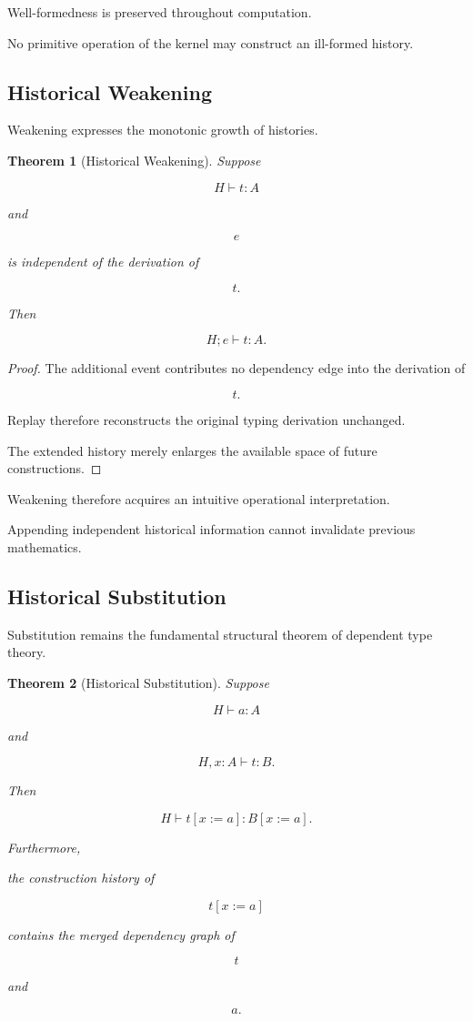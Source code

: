 \documentclass[12pt,oneside]{article}
\newtheorem{theorem}{Theorem}[section]
\theoremstyle{definition}
\theoremstyle{remark}
\begin{document}
Well-formedness is preserved throughout computation.

No primitive operation of the kernel may construct an ill-formed history.

\subsection{Historical Weakening}

Weakening expresses the monotonic growth of histories.

\begin{theorem}[Historical Weakening]

Suppose

\[
H
\vdash
t:A
\]

and

\[
e
\]

is independent of the derivation of

\[
t.
\]

Then

\[
H;e
\vdash
t:A.
\]

\end{theorem}

\begin{proof}

The additional event contributes no dependency edge into the derivation of

\[
t.
\]

Replay therefore reconstructs the original typing derivation unchanged.

The extended history merely enlarges the available space of future
constructions.

\end{proof}

Weakening therefore acquires an intuitive operational interpretation.

Appending independent historical information cannot invalidate previous
mathematics.

\subsection{Historical Substitution}

Substitution remains the fundamental structural theorem of dependent type
theory.

\begin{theorem}[Historical Substitution]

Suppose

\[
H
\vdash
a:A
\]

and

\[
H,x:A
\vdash
t:B.
\]

Then

\[
H
\vdash
t[x:=a]
:
B[x:=a].
\]

Furthermore,

the construction history of

\[
t[x:=a]
\]

contains the merged dependency graph of

\[
t
\]

and

\[
a.
\]

\end{theorem}
\end{document}
